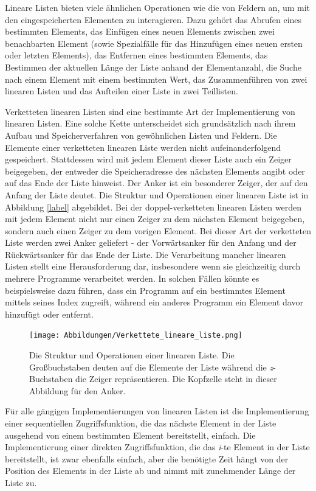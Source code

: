 Lineare Listen bieten viele ähnlichen Operationen wie die von Feldern an, um mit den eingespeicherten Elementen zu interagieren. Dazu gehört das Abrufen eines bestimmten Elements, das Einfügen eines neuen Elements zwischen zwei benachbarten Element (sowie Spezialfälle für das Hinzufügen eines neuen ersten oder letzten Elements), das Entfernen eines bestimmten Elements, das Bestimmen der aktuellen Länge der Liste anhand der Elementanzahl, die Suche nach einem Element mit einem bestimmten Wert, das Zusammenführen von zwei linearen Listen und das Aufteilen einer Liste in zwei Teillisten.\autocite[42-43]{ollmert_datenstrukturen_2020}


Verketteten linearen Listen sind eine bestimmte Art der Implementierung von linearen Listen. Eine solche Kette unterscheidet sich grundsätzlich nach ihrem Aufbau und Speicherverfahren von gewöhnlichen Listen und Feldern. Die Elemente einer verketteten linearen Liste werden nicht aufeinanderfolgend gespeichert. Stattdessen wird mit jedem Element dieser Liste auch ein Zeiger beigegeben, der entweder die Speicheradresse des nächsten Elements angibt oder auf das Ende der Liste hinweist. Der Anker ist ein besonderer Zeiger, der auf den Anfang der Liste deutet. Die Struktur und Operationen einer linearen Liste ist in Abbildung \ref{label} abgebildet. Bei der doppel-verketteten linearen Listen werden mit jedem Element nicht nur einen Zeiger zu dem nächsten Element beigegeben, sondern auch einen Zeiger zu dem vorigen Element. Bei dieser Art der verketteten Liste werden zwei Anker geliefert - der Vorwärtsanker für den Anfang und der Rückwärtsanker für das Ende der Liste. Die Verarbeitung mancher linearen Listen stellt eine Herausforderung dar, insbesondere wenn sie gleichzeitig durch mehrere Programme verarbeitet werden. In solchen Fällen könnte es beispielsweise dazu führen, dass ein Programm auf ein bestimmtes Element mittels seines Index zugreift, während ein anderes Programm ein Element davor hinzufügt oder entfernt. \autocite[43-44]{ollmert_datenstrukturen_2020}

\begin{figure}[t]
	\texttt{[image: Abbildungen/Verkettete\_lineare\_liste.png]}
	\centering
	\caption{Die Struktur und Operationen einer linearen Liste. Die Großbuchstaben deuten auf die Elemente der Liste während die \textit{z}-Buchstaben die Zeiger repräsentieren. Die Kopfzelle steht in dieser Abbildung für den Anker.\autocite[611]{ernst_grundkurs_2020}}
\end{figure}

Für alle gängigen Implementierungen von linearen Listen ist die Implementierung einer sequentiellen Zugriffsfunktion, die das nächste Element in der Liste ausgehend von einem bestimmten Element bereitstellt, einfach. Die Implementierung einer direkten Zugriffsfunktion, die das \textit{i}-te Element in der Liste bereitstellt, ist zwar ebenfalls einfach, aber die benötigte Zeit hängt von der Position des Elements in der Liste ab und nimmt mit zunehmender Länge der Liste zu.\autocite[45]{ollmert_datenstrukturen_2020}

